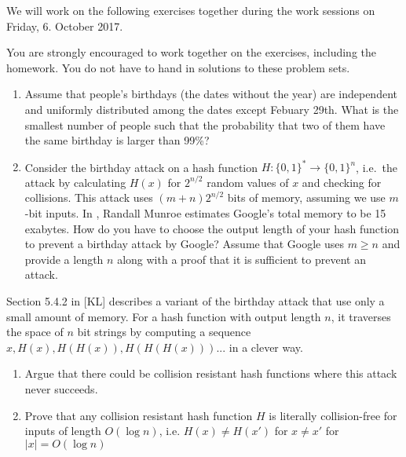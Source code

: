\documentclass[a4paper,10pt,landscape,twocolumn]{scrartcl}
\newcommand\worksession{Friday, 6. October 2017}
\begin{document}
\problems

{\sffamily\noindent
We will work on the following exercises together during the work sessions on \worksession.

You are strongly encouraged to work together on the exercises, including the homework. You do not have to hand in solutions to these problem sets.}

\begin{exercise}
\begin{enumerate}
	\item Assume that people's birthdays (the dates without the year) are independent and uniformly distributed among the dates except Febuary 29th. What is the smallest number of people such that the probability that two of them have the same birthday is larger than 99\%?
	\item Consider the birthday attack on a hash function $H: \{0,1\}^*\to\{0,1\}^n$, i.e.\ the attack by calculating $H(x)$ for $2^{n/2}$ random values of $x$ and checking for collisions. This attack uses $(m+n)2^{n/2}$ bits of memory, assuming we use $m$-bit inputs. In , Randall Munroe estimates Google's total memory to be 15 exabytes.  How do you have to choose the output length of your hash function to prevent a birthday attack by Google? Assume that Google uses $m\ge n$ and provide a length $n$ along with a proof that it is sufficient to prevent an attack.
\end{enumerate}
\end{exercise}

\begin{exercise}
Section 5.4.2 in [KL] describes a variant of the birthday attack that use only a small amount of memory. For a hash function with output length $n$, it traverses the space of $n$ bit strings by computing a sequence $x, H(x), H(H(x)), H(H(H(x)))...$ in a clever way.
\begin{enumerate}
	\item Argue that there could be collision resistant hash functions where this attack never succeeds.
	\item Prove that any collision resistant hash function $H$ is literally collision-free for inputs of length $O(\log n)$, i.e. $H(x)\neq H(x')$ for $x\neq x'$ for $|x|=O(\log n)$
\end{enumerate}
\end{exercise}
\end{document}
